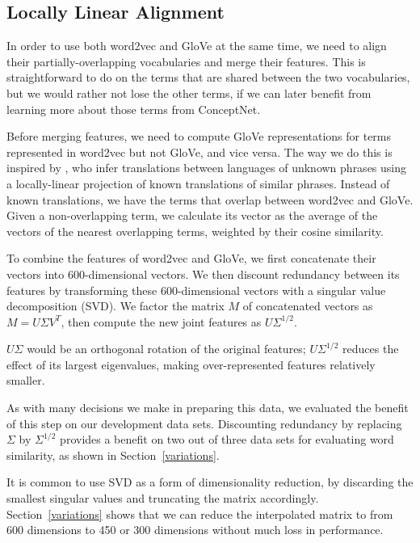 \documentclass[11pt,letterpaper]{article}
\begin{document}
\subsection{Locally Linear Alignment}
\label{locally-linear-alignment}

In order to use both word2vec and GloVe at the same time, we need to align their
partially-overlapping vocabularies and merge their features. This is
straightforward to do on the terms that are shared between the two vocabularies,
but we would rather not lose the other terms, if we can later benefit from
learning more about those terms from ConceptNet.

Before merging features, we need to compute GloVe representations for terms
represented in word2vec but not GloVe, and vice versa. The way we do this
is inspired by , who infer translations between
languages of unknown phrases using a locally-linear projection of known
translations of similar phrases. Instead of known translations, we have the
terms that overlap between word2vec and GloVe. Given a non-overlapping term,
we calculate its vector as the average of the vectors of the nearest
overlapping terms, weighted by their cosine similarity.

To combine the features of word2vec and GloVe, we first concatenate their
vectors into 600-dimensional vectors. We then discount redundancy between its
features by transforming these 600-dimensional vectors with a singular value
decomposition (SVD).  We factor the matrix $M$ of concatenated vectors as $M = U
\Sigma V^T$, then compute the new joint features as $U \Sigma^{1/2}$.

$U \Sigma$ would be an orthogonal rotation of the original features;
$U \Sigma^{1/2}$ reduces the effect of its largest eigenvalues, making
over-represented features relatively smaller.

As with many decisions we make in preparing this data, we evaluated the benefit
of this step on our development data sets.  Discounting redundancy by replacing
$\Sigma$ by $\Sigma^{1/2}$ provides a benefit on two out of three data sets for
evaluating word similarity, as shown in Section~\ref{variations}.

It is common to use SVD as a form of dimensionality reduction, by discarding
the smallest singular values and truncating the matrix accordingly.
Section~\ref{variations} shows that we can reduce the interpolated matrix to
from 600 dimensions to 450 or 300 dimensions without much loss in performance.
\end{document}
